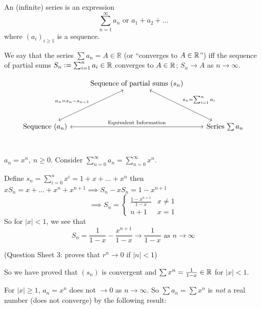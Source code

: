 \documentclass[twoside]{scrartcl}
\begin{document}

\pagebreak

\vspace*{5pt}

\begin{definition}
An (infinite) series is an expression \[\displaystyle{\sum_{n=1}^{\infty} a_n} \text{ or } a_1  + a_2 + \dots \] where $(a_i)_{i\geq 1}$ is a sequence.
\end{definition}


\begin{definition}
We say that the series $\sum a_n = A \in \mathbb{R}$ (or ``converges to $A \in \mathbb{R}$'') iff the sequence of partial sums $S_n:= \sum_{i=1}^n a_i \in \mathbb{R}$ converges to $A \in \mathbb{R}$; $S_n \to A$ as $n \to \infty$. 
\end{definition}



\[
\begin{tikzcd}[row sep=1.5cm]
 &  \mbox{Sequence of partial sums $(s_n)$}\arrow[<->]{dr}{s_n = \sum_{i=1}^n a_i} \\ 
\mbox{Sequence $(a_n)$} \arrow[<->]{ur}{a_n = s_n - s_{n-1}} \arrow[<->]{rr}{\text{Equivalent Information}} && \mbox{Series $\sum a_n$}
\end{tikzcd}
\]~\\



\begin{example}
$a_n = x^n,~n \geq 0$. Consider $\sum_{n=0}^{\infty} a_n = \sum_{n=0}^{\infty} x^n$.

Define $s_n = \sum_{i=0}^n x^i = 1 + x + \dots + x^n$ then $xS_n = x + \dots + x^n + x^{n+1} \implies S_n - xS_n = 1 - x^{n+1}$
\[\implies S_n = \begin{cases}
 \frac{1-x^{n+1}}{1-x} & x \neq 1\\
 n+1 & x = 1	
 \end{cases}
\]
So for $|x| < 1$, we see that 
\[S_n = \frac{1}{1-x} - \frac{x^{n+1}}{1-x} \to \frac{1}{1-x} \text{ as } n \to \infty\]

(Question Sheet 3: proves that $r^n \to 0$ if $|n| < 1$)
\end{example}\vspace*{5pt}

So we have proved that $(s_n)$ is convergent and $\sum x^n = \frac{1}{1-x} \in\mathbb{R}$ for $|x| < 1$. 

For $|x| \geq 1$, $a_n = x^n$ does not $\to 0$ as $n \to \infty$. So $\sum a_n = \sum x^n$ is \emph{not} a real number (does not converge) by the following result:\\
\end{document}
